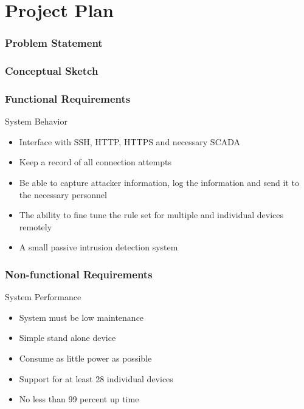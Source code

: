 \section{Project Plan}

\begin{frame}
\frametitle{Problem Statement}


\end{frame}

\begin{frame}
\frametitle{Conceptual Sketch}


\end{frame}

\begin{frame}
\frametitle{Functional Requirements}
System Behavior
\begin{itemize}
\item Interface with SSH, HTTP, HTTPS and necessary SCADA 
\item Keep a record of all connection attempts
\item Be able to capture attacker information, log the information  and send it to the necessary personnel 
\item The ability to fine tune the rule set for multiple and individual devices remotely 
\item A small passive intrusion detection system 
\end{itemize}

\end{frame}

\begin{frame}
\frametitle{Non-functional Requirements}
System Performance
\begin{itemize}
\item System must be low maintenance
\item Simple stand alone device
\item Consume as little power as possible
\item Support for at least 28 individual devices
\item No less than 99 percent up time
\end{itemize}

\end{frame}

